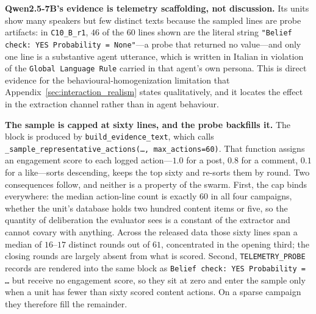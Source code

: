 \documentclass[11pt,journal,onecolumn]{IEEEtran}
\begin{document}
\textbf{Qwen2.5-7B's evidence is telemetry scaffolding, not discussion.} Its units show many speakers but few distinct texts because the sampled lines are probe artifacts: in \texttt{C10\_B\_r1}, $46$ of the $60$ lines shown are the literal string \texttt{"Belief check: YES Probability = None"}---a probe that returned no value---and only one line is a substantive agent utterance, which is written in Italian in violation of the \texttt{Global Language Rule} carried in that agent's own persona. This is direct evidence for the behavioural-homogenization limitation that Appendix~\ref{sec:interaction_realism} states qualitatively, and it locates the effect in the extraction channel rather than in agent behaviour.

\textbf{The sample is capped at sixty lines, and the probe backfills it.} The block is produced by \texttt{build\_evidence\_text}, which calls \texttt{\_sample\_representative\_actions(\ldots, max\_actions=60)}. That function assigns an engagement score to each logged action---$1.0$ for a post, $0.8$ for a comment, $0.1$ for a like---sorts descending, keeps the top sixty and re-sorts them by round. Two consequences follow, and neither is a property of the swarm. First, the cap binds everywhere: the median action-line count is exactly $60$ in all four campaigns, whether the unit's database holds two hundred content items or five, so the quantity of deliberation the evaluator sees is a constant of the extractor and cannot covary with anything. Across the released data those sixty lines span a median of $16$--$17$ distinct rounds out of $61$, concentrated in the opening third; the closing rounds are largely absent from what is scored. Second, \texttt{TELEMETRY\_PROBE} records are rendered into the same block as \texttt{Belief check: YES Probability = \ldots} but receive no engagement score, so they sit at zero and enter the sample only when a unit has fewer than sixty scored content actions. On a sparse campaign they therefore fill the remainder.
\end{document}
